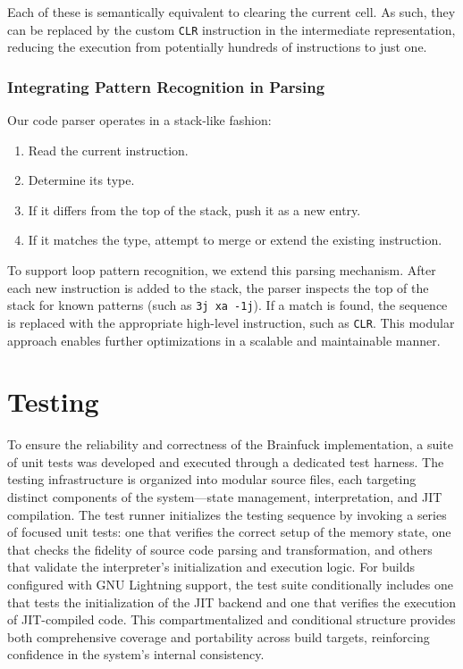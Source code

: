 Each of these is semantically equivalent to clearing the current cell. As such, they can be replaced by the custom \texttt{CLR} instruction in the intermediate representation, reducing the execution from potentially hundreds of instructions to just one.

\subsubsection*{Integrating Pattern Recognition in Parsing}

Our code parser operates in a stack-like fashion:

\begin{enumerate}
    \item Read the current instruction.
    \item Determine its type.
    \item If it differs from the top of the stack, push it as a new entry.
    \item If it matches the type, attempt to merge or extend the existing instruction.
\end{enumerate}

To support loop pattern recognition, we extend this parsing mechanism. After each new instruction is added to the stack, the parser inspects the top of the stack for known patterns (such as \texttt{3j xa -1j}). If a match is found, the sequence is replaced with the appropriate high-level instruction, such as \texttt{CLR}. This modular approach enables further optimizations in a scalable and maintainable manner.

\section{Testing}
\label{sec:ch2sec4}

\par To ensure the reliability and correctness of the Brainfuck implementation, a suite of unit tests was developed and executed through a dedicated test harness. The testing infrastructure is organized into modular source files, each targeting distinct components of the system—state management, interpretation, and JIT compilation. The test runner initializes the testing sequence by invoking a series of focused unit tests: one that verifies the correct setup of the memory state, one that checks the fidelity of source code parsing and transformation, and others that validate the interpreter's initialization and execution logic. For builds configured with GNU Lightning support, the test suite conditionally includes one that tests the initialization of the JIT backend and one that verifies the execution of JIT-compiled code. This compartmentalized and conditional structure provides both comprehensive coverage and portability across build targets, reinforcing confidence in the system's internal consistency.